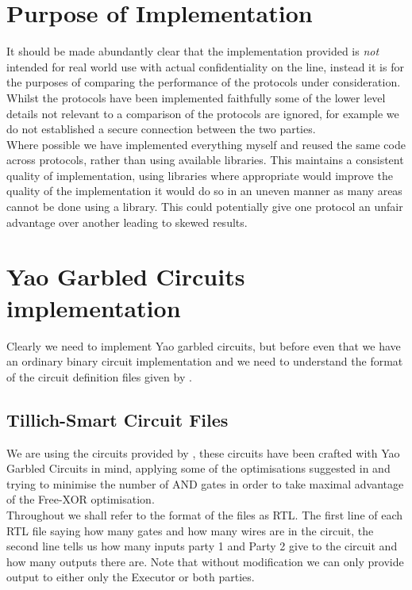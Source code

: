 \documentclass[ %
                    author={Nicholas Tutte},
                supervisor={Prof. Nigel Smart},
                    degree={MEng},
                     title={Secure Two Party Computation},
                  subtitle={A practical comparison of recent protocols},
                      type={Research - GG1K},
                      year={2015} ]{dissertation}
\begin{document}
\begin{appendices}
			\section*{Purpose of Implementation}
				It should be made abundantly clear that the implementation provided is \emph{not} intended for real world use with actual confidentiality on the line, instead it is for the purposes of comparing the performance of the protocols under consideration.\\

				Whilst the protocols have been implemented faithfully some of the lower level details not relevant to a comparison of the protocols are ignored, for example we do not established a secure connection between the two parties.\\

				Where possible we have implemented everything myself and reused the same code across protocols, rather than using available libraries. This maintains a consistent quality of implementation, using libraries where appropriate would improve the quality of the implementation it would do so in an uneven manner as many areas cannot be done using a library. This could potentially give one protocol an unfair advantage over another leading to skewed results.

			\section{Yao Garbled Circuits implementation}

				Clearly we need to implement Yao garbled circuits, but before even that we have an ordinary binary circuit implementation and we need to understand the format of the circuit definition files given by \cite{NigelCircuits}.

				\subsection{Tillich-Smart Circuit Files}

					We are using the circuits provided by \cite{NigelCircuits}, these circuits have been crafted with Yao Garbled Circuits in mind, applying some of the optimisations suggested in \cite{SMC_Is_Practical} and trying to minimise the number of AND gates in order to take maximal advantage of the Free-XOR optimisation.\\

					Throughout we shall refer to the format of the files as RTL. The first line of each RTL file saying how many gates and how many wires are in the circuit, the second line tells us how many inputs party 1 and Party 2 give to the circuit and how many outputs there are. Note that without modification we can only provide output to either only the Executor or both parties.\\


\end{appendices}
\end{document}
